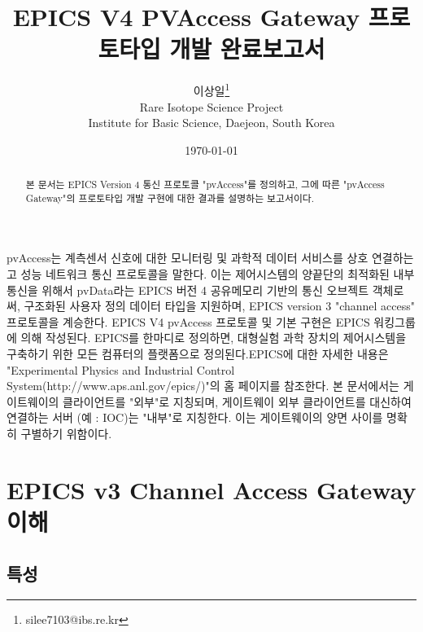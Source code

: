 \documentclass[11pt
  , a4paper
  , article
  , oneside
]{memoir}
\begin{document}
\newcommand{\technumber}{
  RAON Control-Document Series\\
  Revision : v1.0,   Release : 2016-12-02 fixed date}
\title{\textbf{EPICS V4 PVAccess Gateway 프로토타입 개발 완료보고서}}

\author{이상일\thanks{silee7103@ibs.re.kr} \\

  Rare Isotope Science Project\\
  Institute for Basic Science, Daejeon, South Korea
}
\date{\today}

\renewcommand{\maketitlehooka}{\begin{flushright}\textsf{\technumber}\end{flushright}}

\maketitle

\begin{abstract}
본 문서는 EPICS Version 4 통신 프로토콜 "pvAccess"를 정의하고, 그에 따른 "pvAccess Gateway"의 프로토타입 개발 구현에 대한 결과를 설명하는 보고서이다. 
\end{abstract}

pvAccess는 계측센서 신호에 대한 모니터링 및 과학적 데이터 서비스를 상호 연결하는 고 성능 네트워크 통신 프로토콜을 말한다. 이는 제어시스템의 양끝단의 최적화된 내부통신을 위해서 pvData라는 EPICS 버전 4 공유메모리 기반의 통신 오브젝트 객체로써, 구조화된 사용자 정의 데이터 타입을 지원하며, EPICS version 3 "channel access" 프로토콜을 계승한다. EPICS V4 pvAccess 프로토콜 및 기본 구현은 EPICS 워킹그룹에 의해 작성된다. EPICS를 한마디로 정의하면, 대형실험 과학 장치의 제어시스템을 구축하기 위한 모든 컴퓨터의 플랫폼으로 정의된다.EPICS에 대한 자세한 내용은 "Experimental Physics and Industrial Control System(http://www.aps.anl.gov/epics/)"의 홈 페이지를 참조한다. 본 문서에서는 게이트웨이의 클라이언트를 "외부"로 지칭되며, 게이트웨이 외부 클라이언트를 대신하여 연결하는 서버 (예 : IOC)는 "내부"로 지칭한다. 이는 게이트웨이의 양면 사이를 명확히 구별하기 위함이다.

\clearpage

\chapter{EPICS v3 Channel Access Gateway 이해}
\section{특성}
\end{document}
